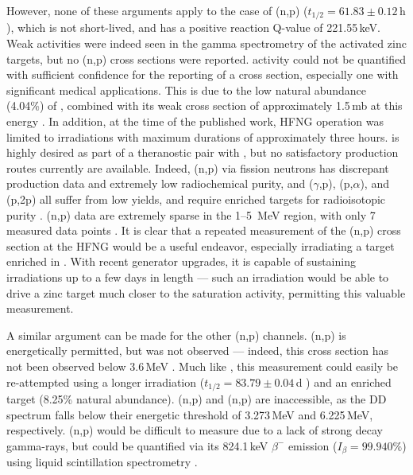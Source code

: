However, none of these arguments apply to the case of (n,p) ($t_{1/2}=61.83\pm0.12$\,h \cite{Junde2005}), which is not short-lived, and has a positive reaction Q-value of 221.55\,keV.
Weak   activities were indeed seen in the gamma spectrometry of the activated zinc targets, but no (n,p) cross sections were reported.
 activity could not be quantified with sufficient confidence for the reporting of a cross section, especially one with significant medical applications. 
This is due to the low natural abundance (4.04\%)  of , combined with its weak cross section of approximately 1.5\,mb at this energy \cite{Shimizu2004975}.
In addition, at the time of the published work, HFNG operation was limited to irradiations with maximum durations of approximately three hours.
 is highly desired as part of a theranostic pair with , but no satisfactory production routes currently are available.
Indeed, (n,p) via fission neutrons has discrepant production data and extremely low radiochemical purity, and ($\gamma$,p), (p,$\alpha$), and (p,2p) all suffer from low yields, and require enriched targets for radioisotopic purity \cite{Qaim201731}.
(n,p) data are extremely sparse in the 1--5\, MeV region, with only 7 measured data points \cite{VanLoef1961,Shimizu2004975,Furuta2008,Bhike2009}.
It is clear that a repeated measurement of the (n,p) cross section at the HFNG would be a useful endeavor, especially irradiating a target enriched in .
With recent generator upgrades, it is capable of sustaining irradiations up to a few days in length --- such an irradiation would be able to drive a zinc target much closer to the  saturation activity, permitting this valuable measurement.





A similar argument can be made for the other (n,p) channels.
(n,p) is energetically permitted, but was not observed --- indeed, this cross section has not been observed below 3.6\,MeV \cite{Smith1975}.
Much like , this measurement could easily be re-attempted using a longer irradiation ($t_{1/2}=83.79\pm0.04$\,d \cite{Wu2000}) and an enriched target (8.25\%  natural  abundance).
(n,p) and (n,p) are inaccessible, as the DD spectrum falls below their energetic threshold of 3.273\,MeV and 6.225\,MeV, respectively.
(n,p) would be difficult to measure due to a lack of strong decay gamma-rays, but could be quantified via its 824.1\,keV $\beta^-$ emission ($I_\beta=99.940\%$) using liquid scintillation spectrometry  \cite{Burrows2008}.


